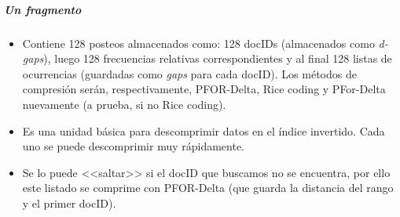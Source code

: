 \subparagraph{Un fragmento}

\begin{itemize}

\item Contiene 128 posteos almacenados como: 128 docIDs (almacenados como \textit{d-gaps}), luego 128 frecuencias relativas correspondientes y al final 128 listas de ocurrencias (guardadas como \textit{gaps} para cada docID). Los métodos de compresión serán, respectivamente, PFOR-Delta, Rice coding y PFor-Delta nuevamente (a prueba, si no Rice coding).

\item Es una unidad básica para descomprimir datos en el índice invertido. Cada uno se puede descomprimir muy rápidamente.

\item Se lo puede <<saltar>> si el docID que buscamos no se encuentra, por ello este listado se comprime con PFOR-Delta (que guarda la distancia del rango y el primer docID).

\end{itemize}
